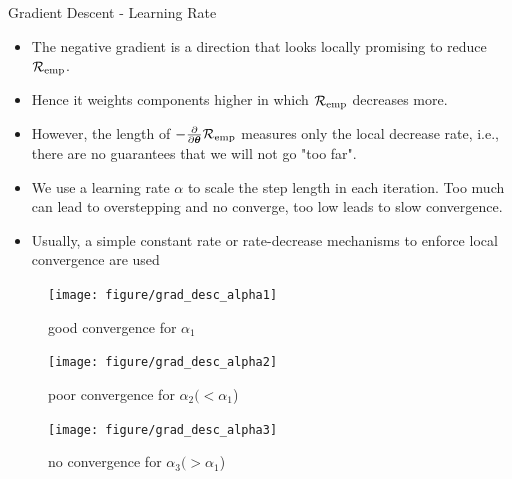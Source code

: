 \documentclass[11pt,compress,t,notes=noshow, xcolor=table]{beamer}
\begin{document}
\begin{vbframe}{Gradient Descent - Learning Rate}
\footnotesize
\begin{itemize}
\item The negative gradient is a direction that looks locally promising to reduce $\mathcal{R}_{\text{emp}}$. \\
\item Hence it weights components higher
    in which $\mathcal{R}_{\text{emp}}$ decreases more. \\
\item However, the length of $-\frac{\partial}{\partial\bm{\theta}}{\mathcal{R}_{\text{emp}}}$ measures only the local decrease rate, i.e., there are no guarantees that we will not go "too far". \\
\item We use a learning rate $\alpha$ to scale the step length in each iteration. Too much can lead to overstepping and no converge, too low leads to slow convergence.
\item Usually, a simple constant rate or rate-decrease mechanisms to enforce local convergence are used
\end{itemize}
\begin{figure}[!htb]
  \texttt{[image: figure/grad\_desc\_alpha1]}
  \caption*{\tiny good convergence for $\alpha_1$}
\endminipage\hfill
{}
  \texttt{[image: figure/grad\_desc\_alpha2]}
  \caption*{\tiny poor convergence for $\alpha_2 (< \alpha_1$)}
\endminipage\hfill
{}%
  \texttt{[image: figure/grad\_desc\_alpha3]}
  \caption*{\tiny no convergence for $\alpha_3 (> \alpha_1$)}
\endminipage
\end{figure}

\end{vbframe}
\end{document}

